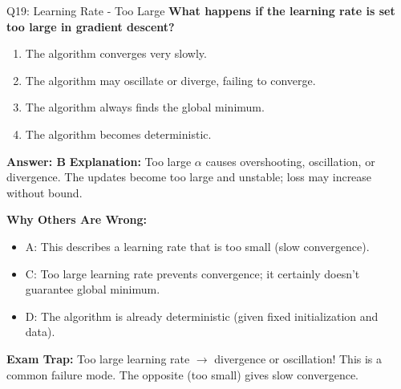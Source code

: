 \documentclass[8pt]{beamer}
\begin{document}
	\begin{frame}{Q19: Learning Rate - Too Large}
		\fontsize{6.5}{7.5}\selectfont
		\textbf{What happens if the learning rate is set too large in gradient descent?}
		
		\begin{enumerate}
			\item The algorithm converges very slowly.
			\item The algorithm may oscillate or diverge, failing to converge.
			\item The algorithm always finds the global minimum.
			\item The algorithm becomes deterministic.
		\end{enumerate}
		
		\vspace{0.05cm}
		\textcolor{myblue}{\textbf{Answer: B}}
		\vspace{0.05cm}
		\textcolor{myblue}{\textbf{Explanation:}} Too large $\alpha$ causes overshooting, oscillation, or divergence. The updates become too large and unstable; loss may increase without bound.
		
		\vspace{0.05cm}
		\textcolor{myred}{\textbf{Why Others Are Wrong:}}
		\begin{itemize}
			\item \textcolor{myred}{A:} This describes a learning rate that is too small (slow convergence).
			\item \textcolor{myred}{C:} Too large learning rate prevents convergence; it certainly doesn't guarantee global minimum.
			\item \textcolor{myred}{D:} The algorithm is already deterministic (given fixed initialization and data).
		\end{itemize}
		
		\textcolor{myred}{\textbf{Exam Trap:}} Too large learning rate $\rightarrow$ \textcolor{myred}{divergence or oscillation}! This is a common failure mode. The opposite (too small) gives slow convergence.
	\end{frame}
	
\end{document}
